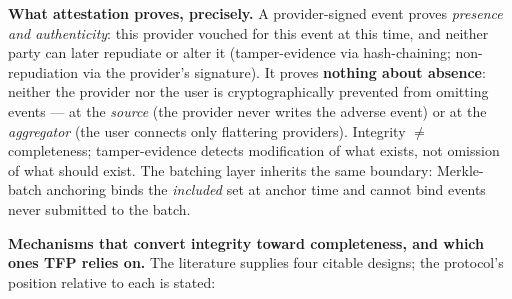 \documentclass[
]{article}
\begin{document}
\textbf{What attestation proves, precisely.} A provider-signed event
proves \emph{presence and authenticity}: this provider vouched for this
event at this time, and neither party can later repudiate or alter it
(tamper-evidence via hash-chaining; non-repudiation via the provider's
signature). It proves \textbf{nothing about absence}: neither the
provider nor the user is cryptographically prevented from omitting
events --- at the \emph{source} (the provider never writes the adverse
event) or at the \emph{aggregator} (the user connects only flattering
providers). Integrity \(\neq\) completeness; tamper-evidence detects
modification of what exists, not omission of what should exist. The
batching layer inherits the same boundary: Merkle-batch anchoring binds
the \emph{included} set at anchor time and cannot bind events never
submitted to the batch.

\textbf{Mechanisms that convert integrity toward completeness, and which
ones TFP relies on.} The literature supplies four citable designs; the
protocol's position relative to each is stated:
\end{document}
